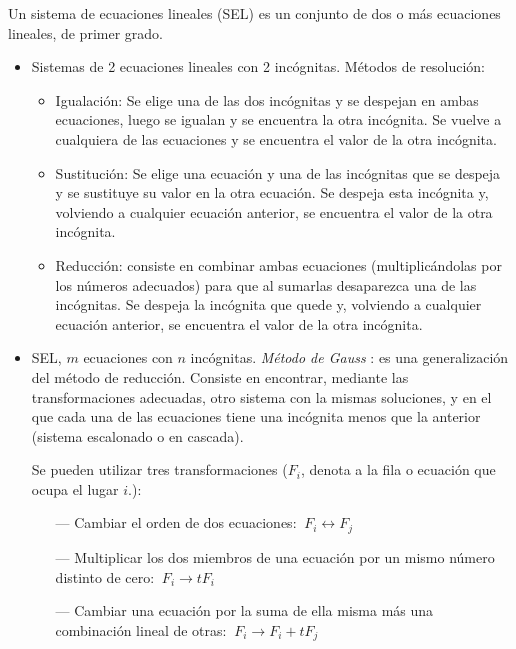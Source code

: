 \begin{definition}

Un sistema de ecuaciones lineales (SEL) es un conjunto de dos o más ecuaciones lineales, de primer grado.	
\end{definition}

\begin{theorem} 

\begin{itemize}
\item Sistemas de 2 ecuaciones lineales con 2 incógnitas. Métodos de resolución:
	\begin{itemize}
	\item Igualación: Se elige una de las dos incógnitas y se despejan en ambas ecuaciones, luego se igualan y se encuentra la otra incógnita. Se vuelve a cualquiera de las ecuaciones y se encuentra el valor de la otra incógnita. 
	\item Sustitución: Se elige una ecuación y una de las incógnitas que se despeja y se sustituye su valor en la otra ecuación. Se despeja esta incógnita y, volviendo a cualquier ecuación anterior, se encuentra el valor de la otra incógnita.
	\item Reducción: consiste en combinar ambas ecuaciones (multiplicándolas por los números adecuados) para que al sumarlas desaparezca una de las incógnitas. Se despeja la incógnita que quede y, volviendo a cualquier ecuación anterior, se encuentra el valor de la otra incógnita.
	\end{itemize}
\vspace{5mm}
\item SEL, $m$ ecuaciones con $n$ incógnitas. \emph{Método de Gauss}	: es una generalización del método de reducción. Consiste en encontrar, mediante las transformaciones adecuadas, otro sistema con la mismas soluciones, y en el que cada una de las ecuaciones tiene una incógnita menos que la anterior (sistema escalonado o en cascada).

Se pueden utilizar tres transformaciones ($F_i$, denota a la fila o ecuación que ocupa el lugar $i$.):

\begin{itemize}

\item [---] Cambiar el orden de dos ecuaciones: $\ F_i \leftrightarrow  F_j$


\item [---] Multiplicar los dos miembros de una ecuación por un mismo número distinto de cero: $\ F_i \to t F_i$


\item [---] Cambiar una ecuación por la suma de ella misma más una combinación lineal de otras: $\ F_i \to  F_i + t F_j$
\end{itemize}
\end{itemize}
	
\end{theorem}

